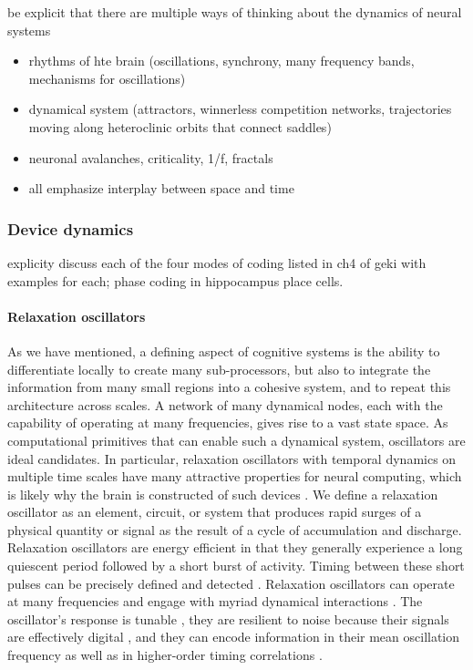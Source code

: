 \documentclass[twocolumn]{article}
\begin{document}
\vspace{3em}
be explicit that there are multiple ways of thinking about the dynamics of neural systems
\begin{itemize}
\item rhythms of hte brain (oscillations, synchrony, many frequency bands, mechanisms for oscillations)
\item dynamical system (attractors, winnerless competition networks, trajectories moving along heteroclinic orbits that connect saddles)
\item neuronal avalanches, criticality, 1/f, fractals
\item all emphasize interplay between space and time
\end{itemize}

\subsubsection{Device dynamics}

\vspace{3em}
explicity discuss each of the four modes of coding listed in ch4 of geki with examples for each; phase coding in hippocampus place cells.

\paragraph{Relaxation oscillators}
As we have mentioned, a defining aspect of cognitive systems is the ability to differentiate locally to create many sub-processors, but also to integrate the information from many small regions into a cohesive system, and to repeat this architecture across scales. A network of many dynamical nodes, each with the capability of operating at many frequencies, gives rise to a vast state space. As computational primitives that can enable such a dynamical system, oscillators are ideal candidates. In particular, relaxation oscillators \cite{st2015,mist1990,soko1993,lued1997,huya2000,bu2006,gile2011,vepe1968,cacl1981} with temporal dynamics on multiple time scales \cite{soko1993} have many attractive properties for neural computing, which is likely why the brain is constructed of such devices \cite{ll1988}. We define a relaxation oscillator as an element, circuit, or system that produces rapid surges of a physical quantity or signal as the result of a cycle of accumulation and discharge. Relaxation oscillators are energy efficient in that they generally experience a long quiescent period followed by a short burst of activity. Timing between these short pulses can be precisely defined and detected \cite{bu2006}. Relaxation oscillators can operate at many frequencies \cite{huya2000} and engage with myriad dynamical interactions \cite{lued1997}. The oscillator's response is tunable \cite{huya2000}, they are resilient to noise because their signals are effectively digital \cite{stgo2005}, and they can encode information in their mean oscillation frequency as well as in higher-order timing correlations \cite{pasc1999,thde2001,sase2001,stse2007,brcl2010,haah2015}.
\end{document}
